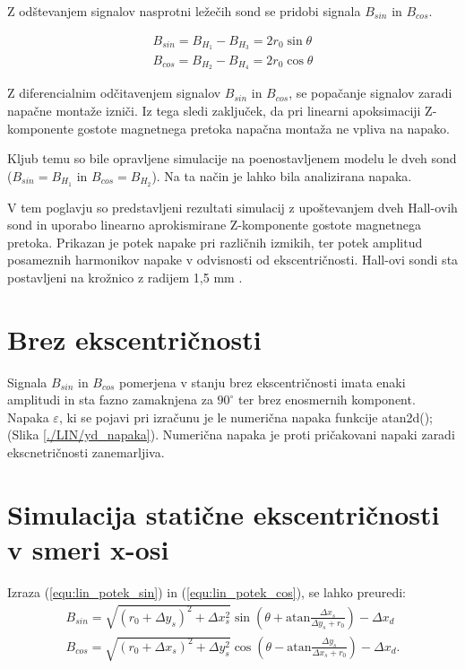 Z odštevanjem signalov nasprotni ležečih sond se pridobi signala  $B_{sin}$ in $B_{cos}$.

\begin{eqnarray}
B_{sin}=  B_{H_1} - B_{H_3} = 2 r_0 \sin \theta \\
B_{cos}=  B_{H_2} - B_{H_4}=  2 r_0 \cos \theta
\end{eqnarray}

Z diferencialnim odčitavenjem signalov  $B_{sin}$ in $B_{cos}$, se popačanje signalov zaradi napačne montaže izniči. Iz tega sledi zaključek, da pri linearni apoksimaciji Z-komponente gostote magnetnega pretoka napačna montaža ne vpliva na napako.

Kljub temu so bile opravljene simulacije na poenostavljenem modelu le dveh sond
 ($B_{sin}=B_{H_1}$ in $B_{cos}=B_{H_2}$). Na ta način je lahko bila analizirana napaka.

V tem poglavju so predstavljeni rezultati simulacij z upoštevanjem dveh Hall-ovih sond in uporabo linearno aprokismirane Z-komponente gostote magnetnega pretoka.
Prikazan je potek napake pri različnih izmikih, ter potek amplitud posameznih harmonikov napake v odvisnosti od ekscentričnosti.
Hall-ovi sondi sta postavljeni na krožnico z radijem 1,5 mm \cite{AM8192}.
\section{Brez ekscentričnosti}
Signala $B_{sin}$ in $B_{cos}$ pomerjena v stanju brez ekscentričnosti imata enaki amplitudi in sta fazno zamaknjena za $90^{\circ}$ ter brez enosmernih komponent. Napaka $\varepsilon$, ki se pojavi pri izračunu je le numerična napaka funkcije atan2d(); (Slika \ref{./LIN/yd_napaka}). Numerična napaka je proti pričakovani napaki zaradi ekscnetričnosti zanemarljiva.
\section{Simulacija statične ekscentričnosti v smeri x-osi}
Izraza (\ref{equ:lin_potek_sin}) in (\ref{equ:lin_potek_cos}), se lahko preuredi:
\begin{eqnarray}
\label{equ:linearna_atan_sin}
B_{sin}= \sqrt{(r_0+\Delta y_s)^2+\Delta x_s^2} \sin(\theta+  \mathrm{ atan} \frac{\Delta x_s}{\Delta y_s +r_0})-\Delta x_d\\
\label{equ:linearna_atan_cos}
B_{cos}= \sqrt{(r_0+\Delta x_s)^2+\Delta y_s^2} \cos(\theta-  \mathrm{ atan} \frac{\Delta y_s}{\Delta x_s +r_0}) -\Delta x_d.
\end{eqnarray}

